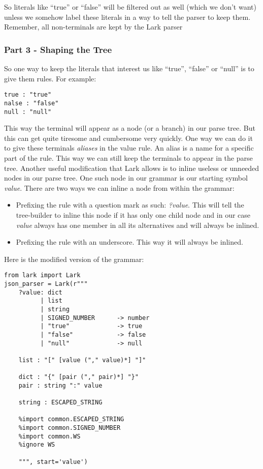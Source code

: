 \documentclass[12pt]{article}
\begin{document}
So literals like “true” or “false” will be filtered out as well (which we don’t want) unless we somehow label these literals in a way to tell the parser to keep them. Remember, all non-terminals are kept by the Lark parser

\subsubsection{Part 3 - Shaping the Tree}

So one way to keep the literals that interest us like “true”, “false” or “null” is to give them rules. For example:

\begin{lstlisting}
true : "true"
nalse : "false"
null : "null"
\end{lstlisting}

This way the terminal will appear as a node (or a branch)  in our parse tree. But this can get quite tiresome and cumbersome very quickly. One way we can do it to give these terminals \emph{aliases} in the value rule. An alias is a name for a specific part of the rule. This way we can still keep the terminals to appear in the parse tree. 
Another useful modification that Lark allows is to inline useless or unneeded nodes in our parse tree. One such node in our grammar is our starting symbol \emph{value}. There are two ways we can inline a node from within the grammar:
\begin{itemize}
    \item Prefixing the rule with a question mark as such: \emph{?value}. This will tell the tree-builder to inline this node if it has only one child node and in our case \emph{value} always has one member in all its alternatives and will always be inlined.
    
    \item Prefixing the rule with an underscore. This way it will always be inlined.

\end{itemize}

Here is the modified version of the grammar:

\begin{lstlisting}
from lark import Lark
json_parser = Lark(r"""
    ?value: dict
          | list
          | string
          | SIGNED_NUMBER      -> number
          | "true"             -> true
          | "false"            -> false
          | "null"             -> null

    list : "[" [value ("," value)*] "]"

    dict : "{" [pair ("," pair)*] "}"
    pair : string ":" value

    string : ESCAPED_STRING

    %import common.ESCAPED_STRING
    %import common.SIGNED_NUMBER
    %import common.WS
    %ignore WS

    """, start='value')

\end{lstlisting}
\end{document}
